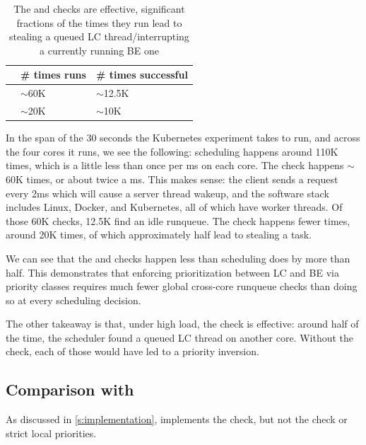 \begin{table}[t]
    \centering
    \begin{tabular}{|l|l|l|}
        \hline
                & \# times runs & \# times successful \\ \hline
        \entry{} & $\sim$60K    & $\sim$12.5K         \\ \hline
        \exit{}  & $\sim$20K    & $\sim$10K          \\ \hline
    \end{tabular}
    \vspace{10pt}
    \caption{The \exit{} and \entry{} checks are effective, significant
    fractions of the times they run lead to stealing a queued LC
    thread/interrupting a currently running BE one}\label{tab:check-counts}
\end{table}

In the span of the 30 seconds the Kubernetes experiment takes to run, and across
the four cores it runs, we see the following: scheduling happens around 110K
times, which is a little less than once per ms on each core. The \entry{} check
happens $\sim$60K times, or about twice a ms. This makes sense: the client sends
a request every 2ms which will cause a server thread wakeup, and the software
stack includes Linux, Docker, and Kubernetes, all of which have worker threads.
Of those 60K \entry{} checks, 12.5K find an idle runqueue. The \exit{} check
happens fewer times, around 20K times, of which approximately half lead to
stealing a \schednormal{} task.

We can see that the \entry{} and \exit{} checks happen less than scheduling does
by more than half. This demonstrates that enforcing prioritization between LC
and BE via priority classes requires much fewer global cross-core runqueue
checks than doing so at every scheduling decision.

The other takeaway is that, under high load, the \exit{} check is effective:
around half of the time, the scheduler found a queued LC thread on another core.
Without the check, each of those would have led to a priority inversion.


\subsection{Comparison with \schedidle}\label{ss:eval:schedidle}

As discussed in \autoref{s:implementation}, \schedidle{} implements the \entry{}
check, but not the \exit{} check or strict local priorities.

